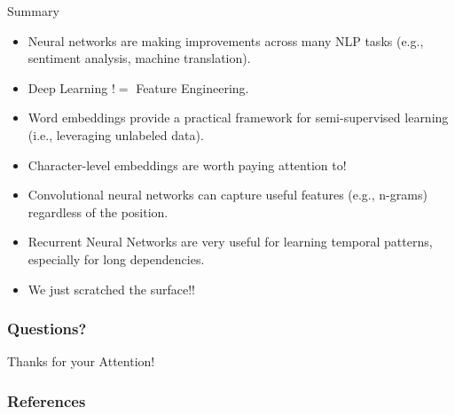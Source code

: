 \documentclass[handout]{beamer}
\begin{document}
\begin{frame}{Summary}
\begin{scriptsize}
\begin{itemize}
\item Neural networks are making improvements across many NLP tasks (e.g., sentiment analysis, machine translation).
\item Deep Learning $!=$ Feature Engineering.
\item Word embeddings provide a practical framework for semi-supervised learning (i.e., leveraging unlabeled data).
\item Character-level embeddings are worth paying attention to!
\item Convolutional neural networks can capture useful features (e.g., n-grams) regardless of the position.
\item Recurrent Neural Networks are very useful for learning temporal patterns, especially for long dependencies.
\item We just scratched the surface!!
\end{itemize}
\end{scriptsize}
\end{frame}




\begin{frame}
\frametitle{Questions?}
\begin{center}\LARGE Thanks for your Attention!\\ \end{center}



\end{frame}

\begin{frame}[allowframebreaks]\scriptsize
\frametitle{References}


%
\end{frame}  


\end{document}
